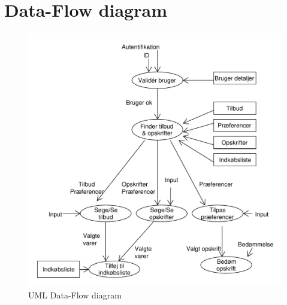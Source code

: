 \chapter{Data-Flow diagram}
\begin{figure}[h]
\includegraphics[width=\linewidth]{images/Diagrams/Dataflowdiagram_0.pdf}
\caption{UML Data-Flow diagram}
\end{figure}